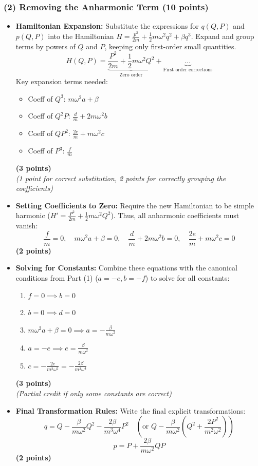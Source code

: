 \documentclass[11pt, a4paper]{article} %
\begin{document}
\subsubsection*{(2) Removing the Anharmonic Term (10 points)}
\begin{itemize}
    \item \textbf{Hamiltonian Expansion:} Substitute the expressions for $q(Q,P)$ and $p(Q,P)$ into the Hamiltonian $H = \frac{p^2}{2m} + \frac{1}{2}m\omega^2q^2 + \beta q^3$. Expand and group terms by powers of $Q$ and $P$, keeping only first-order small quantities.
    \[ H(Q,P) = \underbrace{\frac{P^2}{2m} + \frac{1}{2}m\omega^2Q^2}_{\text{Zero order}} + \underbrace{\dots}_{\text{First order corrections}} \]
    Key expansion terms needed:
    \begin{itemize}
        \item Coeff of $Q^3$: $m\omega^2 a + \beta$
        \item Coeff of $Q^2P$: $\frac{d}{m} + 2m\omega^2 b$
        \item Coeff of $QP^2$: $\frac{2e}{m} + m\omega^2 c$
        \item Coeff of $P^3$: $\frac{f}{m}$
    \end{itemize}
    \hfill \textbf{(3 points)} \\
    \textit{(1 point for correct substitution, 2 points for correctly grouping the coefficients)}

    \item \textbf{Setting Coefficients to Zero:} Require the new Hamiltonian to be simple harmonic ($H' = \frac{P^2}{2m} + \frac{1}{2}m\omega^2Q^2$). Thus, all anharmonic coefficients must vanish:
    \[
    \frac{f}{m} = 0, \quad m\omega^2 a + \beta = 0, \quad \frac{d}{m} + 2m\omega^2 b = 0, \quad \frac{2e}{m} + m\omega^2 c = 0
    \]
    \hfill \textbf{(2 points)}

    \item \textbf{Solving for Constants:} Combine these equations with the canonical conditions from Part (1) ($a=-e, b=-f$) to solve for all constants:
    \begin{enumerate}
        \item $f=0 \implies b=0$
        \item $b=0 \implies d=0$
        \item $m\omega^2 a + \beta = 0 \implies a = -\frac{\beta}{m\omega^2}$
        \item $a = -e \implies e = \frac{\beta}{m\omega^2}$
        \item $c = -\frac{2e}{m^2\omega^2} = -\frac{2\beta}{m^3\omega^4}$
    \end{enumerate}
    \hfill \textbf{(3 points)} \\
    \textit{(Partial credit if only some constants are correct)}

    \item \textbf{Final Transformation Rules:} Write the final explicit transformations:
    \[
    q = Q - \frac{\beta}{m\omega^2}Q^2 - \frac{2\beta}{m^3\omega^4}P^2 \quad \left( \text{or } Q - \frac{\beta}{m\omega^2}\left(Q^2 + \frac{2P^2}{m^2\omega^2}\right) \right)
    \]
    \[
    p = P + \frac{2\beta}{m\omega^2}QP
    \]
    \hfill \textbf{(2 points)}
\end{itemize}
\end{document}
